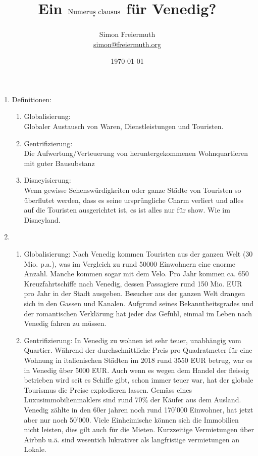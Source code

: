 \documentclass[12pt, letterpaper, twoside]{article}
\title{Ein $\underset{"}{\text{Numerus clausus}} $ für Venedig?}
\author{Simon Freiermuth \\ \href{mailto:simon@freiermuth.org}{simon@freiermuth.org}}
\date{\today}
\begin{document}
\maketitle

\begin{flushleft}

\begin{enumerate}[label=\textbf{\arabic* .}]
    \item %
    Definitionen:

    \begin{enumerate}[label=\textbf{\alph* )}]
	\item %
	Globalisierung:\\
	Globaler Austausch von Waren, Dienstleistungen und Touristen.

	\item %
	Gentrifizierung:\\
	Die Aufwertung/Verteuerung von heruntergekommenen Wohnquartieren mit guter Bausubstanz

	\item %
	Disneyisierung:\\
	Wenn gewisse Sehenswürdigkeiten oder ganze Städte von Touristen so überflutet werden, dass
	es seine ursprüngliche Charm verliert und alles auf die Touristen ausgerichtet ist, es ist alles
	nur für show. Wie im Disneyland.


    \end{enumerate}

    \item %
    \begin{enumerate}[label=\textbf{\alph* )}]


	\item %
	Globalisierung:
	Nach Venedig kommen Touristen aus der ganzen Welt (30 Mio. p.a.), was im Vergleich zu rund 50000
	Einwohnern eine enorme Anzahl. Manche kommen sogar mit dem Velo. Pro Jahr kommen ca. 650
	Kreuzfahrtschiffe nach Venedig, dessen Passagiere rund 150 Mio. EUR pro Jahr in der Stadt ausgeben.
	Besucher aus der ganzen Welt drangen sich in den Gassen und Kanalen. Aufgrund seines
	Bekanntheitsgrades und der romantischen Verklärung hat jeder das Gefühl, einmal im Leben nach
	Venedig fahren zu müssen.

	\item %
	Gentrifizierung:
	In Venedig zu wohnen ist sehr teuer, unabhängig vom Quartier. Während der
	durchschnittliche Preis pro Quadratmeter für eine Wohnung in italienischen Städten im 2018
	rund 3550 EUR betrug, war es in Venedig über 5000 EUR. Auch wenn es
	wegen dem Handel der fleissig betrieben wird seit es Schiffe gibt, schon immer teuer war,
	hat der globale Tourismus die Preise explodieren lassen.
	Gemäss eines Luxusimmobilienmaklers sind rund 70\% der Käufer aus dem Ausland.
	Venedig zählte in den 60er jahren noch rund 170'000 Einwohner, hat jetzt aber nur noch 50'000.
	Viele Einheimische können sich die Immobilien nicht leisten, dies gilt auch für die Mieten.
	Kurzzeitige Vermietungen über Airbnb u.ä. sind wesentich lukrativer als langfristige vermietungen
	an Lokale.


\end{enumerate}
\end{enumerate}
\end{flushleft}
\end{document}
